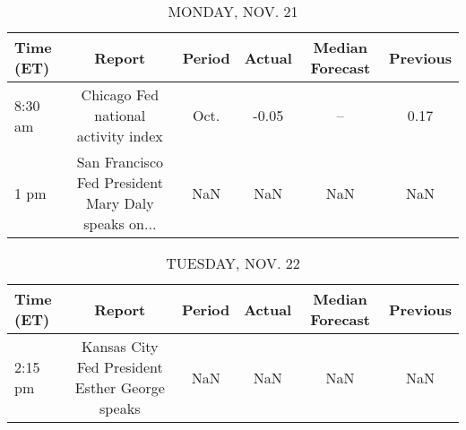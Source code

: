 \documentclass{article}%
\begin{document}
%
\normalsize%


\begin{table}[htbp]%
\caption{MONDAY, NOV. 21}%
\centering%
\begin{adjustbox}{width=1\textwidth}%
\begin{tabular}{lccccc}
\toprule
Time (ET) &                                             Report & Period & Actual & Median Forecast & Previous \\
\midrule
  8:30 am &                Chicago Fed national activity index &   Oct. &  -0.05 &              -- &     0.17 \\
     1 pm & San Francisco Fed President Mary Daly speaks on... &    NaN &    NaN &             NaN &      NaN \\
\bottomrule
\end{tabular}
%
\end{adjustbox}%
\end{table}

%


\begin{table}[htbp]%
\caption{TUESDAY, NOV. 22}%
\centering%
\begin{adjustbox}{width=1\textwidth}%
\begin{tabular}{lccccc}
\toprule
Time (ET) &                                         Report & Period & Actual & Median Forecast & Previous \\
\midrule
  2:15 pm & Kansas City Fed President Esther George speaks &    NaN &    NaN &             NaN &      NaN \\
\bottomrule
\end{tabular}
%
\end{adjustbox}%
\end{table}

%
\end{document}
